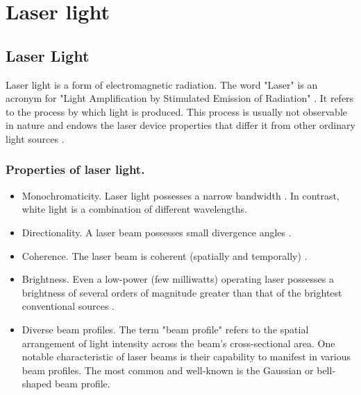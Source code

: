 \documentclass[letterpaper,12pt,oneside]{book}
\begin{document}
\chapter{Laser light}
\section{Laser Light}
Laser light is a form of electromagnetic radiation. 
The word "Laser" is an acronym for "Light Amplification
by Stimulated Emission of Radiation" \cite{svelto2010principles}. It refers to the process by which light is produced. This process is usually not observable in nature \cite{nilsson2020development} and endows the laser device properties that differ it from other ordinary light sources \cite{svelto2010principles}.


\subsection{Properties of laser light.}
\begin{itemize}
    \item Monochromaticity.
    Laser light possesses a narrow bandwidth \cite{svelto2010principles}. In contrast, white light is a combination of different wavelengths. 
    
    \item Directionality. A laser beam possesses small divergence angles \cite{svelto2010principles}.
    \item Coherence. The laser beam is coherent (spatially and temporally) \cite{svelto2010principles}.
    \item Brightness. Even a low-power (few milliwatts) operating laser possesses a brightness of
several orders of magnitude greater than that of the brightest conventional sources \cite{svelto2010principles}.
\item Diverse beam profiles. The term "beam profile" refers to the spatial arrangement of light intensity across the beam's cross-sectional area. One notable characteristic of laser beams is their capability to manifest in various beam profiles. The most common and well-known is the Gaussian or bell-shaped beam profile. %


    
\end{itemize}
\end{document}
